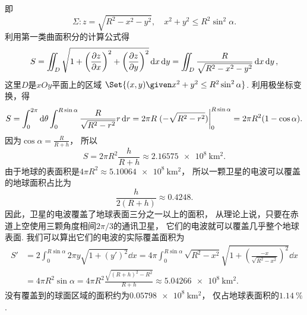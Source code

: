 \begin{example}
即\[
	\Sigma: z=\sqrt{R^2-x^2-y^2}, \quad x^2+y^2 \leq R^2\sin^2\alpha.
\]
利用第一类曲面积分的计算公式得\[
	S = \iint_D \sqrt{1+\left(\pdv{z}{x}\right)^2+\left(\pdv{z}{y}\right)^2} \dd{x}\dd{y}
	= \iint_D \frac{R}{\sqrt{R^2-x^2-y^2}} \dd{x}\dd{y},
\]
这里\(D\)是\(xOy\)平面上的区域
\(\Set{ (x,y) \given x^2+y^2 \leq R^2\sin^2\alpha }\).
利用极坐标变换，得\[
	S = \int_0^{2\pi} \dd\theta
	\int_0^{R\sin\alpha} \frac{R}{\sqrt{R^2-r^2}} r\dd{r}
	= 2\pi R \eval{(-\sqrt{R^2-r^2})}_0^{R\sin\alpha}
	= 2\pi R^2(1-\cos\alpha).
\]
因为\(\cos\alpha=\frac{R}{R+h}\)，
所以\[
	S = 2\pi R^2\frac{h}{R+h}
	\approx \qty{2.16575e8}{\kilo\meter\squared}.
\]
由于地球的表面积是\(4\pi R^2 \approx \qty{5.10064e8}{\kilo\meter\squared}\)，
所以一颗卫星的电波可以覆盖的地球面积占比为\[
	\frac{h}{2(R+h)}
	\approx \num{0.4248}.
\]
因此，卫星的电波覆盖了地球表面三分之一以上的面积，
从理论上说，只要在赤道上空使用三颗角度相间\(2\pi/3\)的通讯卫星，
它们的电波就可以覆盖几乎整个地球表面.
我们可以算出它们的电波的实际覆盖面积为\begin{align*}
	S' &= 2\int_0^{R\sin\alpha} 2\pi y \sqrt{1+(y')^2} \dd{x}
	= 4\pi \int_0^{R\sin\alpha} \sqrt{R^2-x^2} \sqrt{1+\left(\frac{-x}{\sqrt{R^2-x^2}}\right)^2} \dd{x} \\
	&= 4\pi R^2\sin\alpha
	= 4\pi R^2 \frac{\sqrt{(R+h)^2-R^2}}{R+h}
	\approx \qty{5.04266e8}{\kilo\meter\squared}.
\end{align*}
没有覆盖到的球面区域的面积约为\(\qty{0.05798e8}{\kilo\meter\squared}\)，
仅占地球表面积的\(\qty{1.14}{\percent}\).
\end{example}

